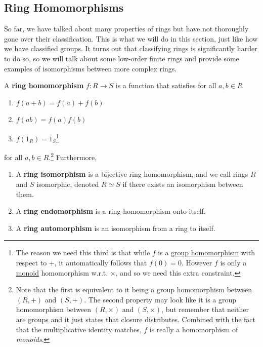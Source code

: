 \subsection{Ring Homomorphisms}

  So far, we have talked about many properties of rings but have not thoroughly gone over their classification. This is what we will do in this section, just like how we have classified groups. It turns out that classifying rings is significantly harder to do so, so we will talk about some low-order finite rings and provide some examples of isomorphisms between more complex rings. 

  \begin{definition}
    \label{def:ring-homomorphism-isomorphism}
    A \textbf{ring homomorphism} $f: R \rightarrow S$ is a function that satisfies for all $a, b \in R$
    \begin{enumerate}
      \item $f(a + b) = f(a) + f(b)$
      \item $f(ab) = f(a) f(b)$ 
      \item $f(1_R) = 1_S$\footnote{The reason we need this third is that while $f$ is a \hyperref[def:group-homomorphism]{group homomorphism} with respect to $+$, it automatically follows that $f(0) = 0$. However $f$ is only a \hyperref[def:monoid]{monoid} homomorphism w.r.t. $\times$, and so we need this extra constraint. }
    \end{enumerate}
    for all $a, b \in R$.\footnote{Note that the first is equivalent to it being a group homomorphism between $(R, +)$ and $(S, +)$. The second property may look like it is a group homomorphism between $(R, \times)$ and $(S, \times)$, but remember that neither are groups and it just states that closure distributes. Combined with the fact that the multiplicative identity matches, $f$ is really a homomorphism of \textit{monoids}. } Furthermore, 
    \begin{enumerate}
      \item A \textbf{ring isomorphism} is a bijective ring homomorphism, and we call rings $R$ and $S$ isomorphic, denoted $R \simeq S$ if there exists an isomorphism between them. 
      \item A \textbf{ring endomorphism} is a ring homomorphism onto itself. 
      \item A \textbf{ring automorphism} is an isomorphism from a ring to itself. 
    \end{enumerate}
  \end{definition} 

